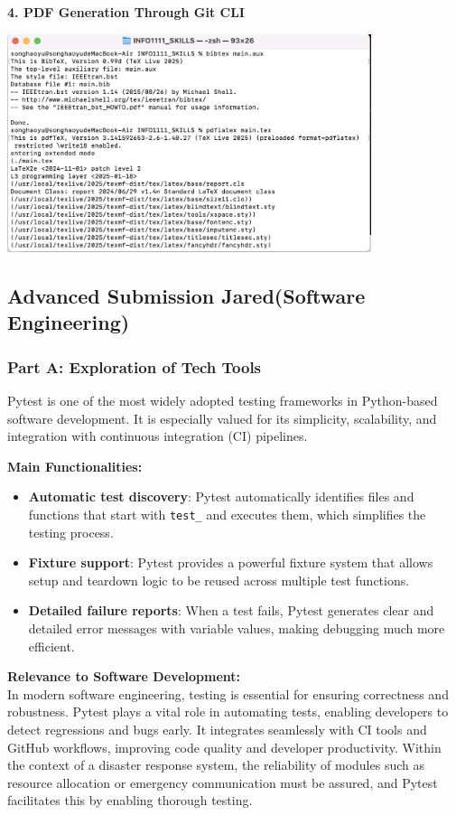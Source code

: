 \documentclass[a4paper, 11pt]{report}
\begin{document}
\textbf{4. PDF Generation Through Git CLI}
\begin{center}
\includegraphics[width=0.8\textwidth]{Jared/git.png}  
\end{center}

\subsection{Advanced Submission Jared(Software Engineering)}

\subsubsection{Part A: Exploration of Tech Tools}

Pytest is one of the most widely adopted testing frameworks in Python-based software development. It is especially valued for its simplicity, scalability, and integration with continuous integration (CI) pipelines.

\textbf{Main Functionalities:}
\begin{itemize}
  \item \textbf{Automatic test discovery}: Pytest automatically identifies files and functions that start with \texttt{test\_} and executes them, which simplifies the testing process.
  \item \textbf{Fixture support}: Pytest provides a powerful fixture system that allows setup and teardown logic to be reused across multiple test functions.
  \item \textbf{Detailed failure reports}: When a test fails, Pytest generates clear and detailed error messages with variable values, making debugging much more efficient.
\end{itemize}

\textbf{Relevance to Software Development:} \\
In modern software engineering, testing is essential for ensuring correctness and robustness. Pytest plays a vital role in automating tests, enabling developers to detect regressions and bugs early. It integrates seamlessly with CI tools and GitHub workflows, improving code quality and developer productivity. Within the context of a disaster response system, the reliability of modules such as resource allocation or emergency communication must be assured, and Pytest facilitates this by enabling thorough testing.
\end{document}
